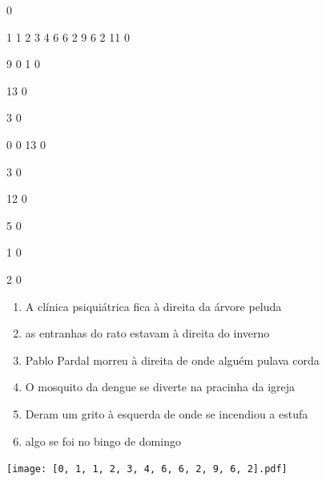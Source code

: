 \documentclass[12pt]{article}
\begin{document}
		\vfill  
		  
{
	0	%

	1	%
	1	%
	2	%
	3	%
	4	%
	6	%
	6	%
	2	%
	9	%
	6	%
	2	%
	11	%
	0	%

	9	%
	0	%
	1	%
	0	%

	13	%
	0	%

	3	%
	0	%

	0	%
	0	%
	13	%
	0	%

	3	%
	0	%

	12	%
	0	%

	5	%
	0	%

	1	%
	0	%

	2	%
	0	%

}	  
		    	

		 

\pagebreak


	\begin{enumerate}
		  \sffamily %
		  \large %


\vfill \item
A clínica psiquiátrica fica	%
à direita
da árvore peluda	%

\vfill \item
as entranhas do rato estavam	%
à direita
do inverno	%

\vfill \item
Pablo Pardal morreu	%
à direita
de onde alguém pulava corda	%

\vfill \item
O mosquito da dengue se diverte	%
na pracinha da igreja	%

\vfill \item
Deram um grito	%
à esquerda
de onde se incendiou a estufa	%

\vfill \item
algo se foi	%
no bingo de domingo	%
	\end{enumerate}
		  
		  \hfill

		  \vfill

\texttt{[image: [0, 1, 1, 2, 3, 4, 6, 6, 2, 9, 6, 2].pdf]}


	\hfill	  	  
\end{document}
